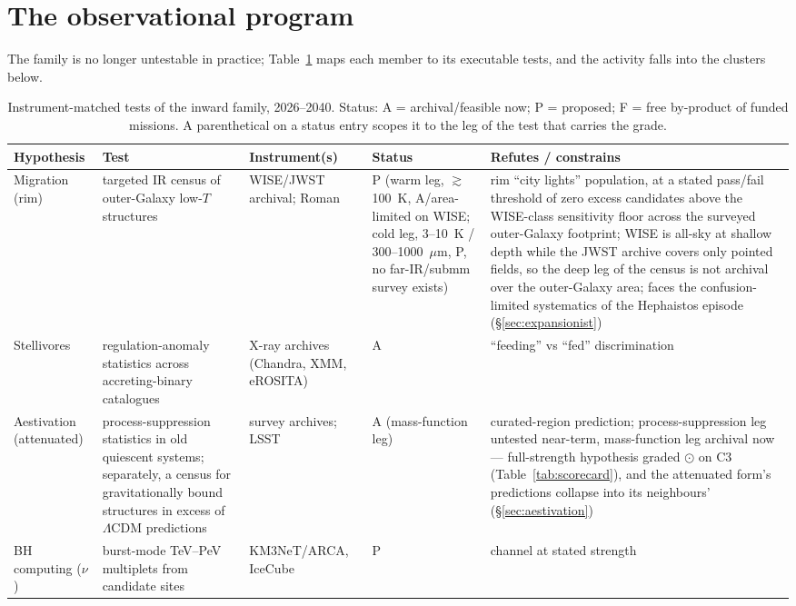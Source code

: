 \documentclass[11pt]{article}
\newcommand{\shalf}{\ensuremath{\odot}} %
\begin{document}
\section{The observational program}
\label{sec:program}

The family is no longer untestable in practice; Table~\ref{tab:tests} maps each member to its executable tests, and the activity falls into the clusters below.

\begin{table}[tbp]
\centering
\caption{Instrument-matched tests of the inward family, 2026--2040. Status: A = archival/feasible now; P = proposed; F = free by-product of funded missions. A parenthetical on a status entry scopes it to the leg of the test that carries the grade.}
\label{tab:tests}
\scriptsize
\begin{tabular}{p{2.4cm}p{3.4cm}p{2.8cm}p{1.9cm}p{2.9cm}}
\toprule
Hypothesis & Test & Instrument(s) & Status & Refutes / constrains \\
\midrule
Migration (rim) & targeted IR census of outer-Galaxy low-$T$ structures & WISE/JWST archival; Roman & P (warm leg, $\gtrsim$100~K, A/area-limited on WISE; cold leg, 3--10~K / 300--1000~$\mu$m, P, no far-IR/submm survey exists) & rim ``city lights'' population, at a stated pass/fail threshold of zero excess candidates above the WISE-class sensitivity floor across the surveyed outer-Galaxy footprint; WISE is all-sky at shallow depth while the JWST archive covers only pointed fields, so the deep leg of the census is not archival over the outer-Galaxy area; faces the confusion-limited systematics of the Hephaistos episode (\S\ref{sec:expansionist}) \\
Stellivores & regulation-anomaly statistics across accreting-binary catalogues & X-ray archives (Chandra, XMM, eROSITA) & A & ``feeding'' vs ``fed'' discrimination \\
Aestivation (attenuated) & process-suppression statistics in old quiescent systems; separately, a census for gravitationally bound structures in excess of $\Lambda$CDM predictions \citep{Sandberg2016} & survey archives; LSST & A (mass-function leg) & curated-region prediction; process-suppression leg untested near-term, mass-function leg archival now --- full-strength hypothesis graded \shalf{} on C3 (Table~\ref{tab:scorecard}), and the attenuated form's predictions collapse into its neighbours' (\S\ref{sec:aestivation}) \\
BH computing ($\nu$) & burst-mode TeV--PeV multiplets from candidate sites & KM3NeT/ARCA, IceCube & P & \citet{Dvali2023} channel at stated strength \\

\end{tabular}
\end{table}
\end{document}
